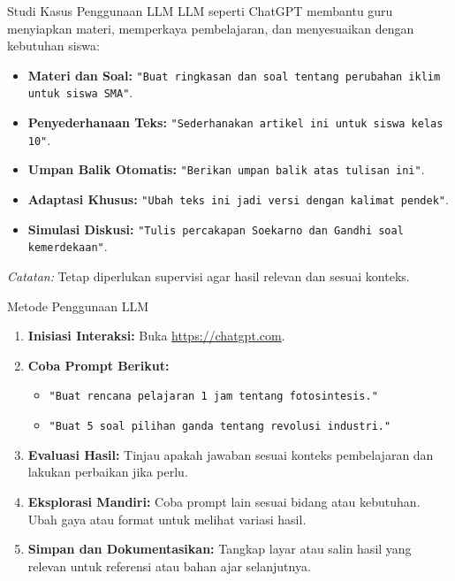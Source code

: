 \documentclass[aspectratio=169, table]{beamer}
\begin{document}
\begin{frame}[fragile]{Studi Kasus Penggunaan LLM}
\vspace{20pt}
	LLM seperti ChatGPT membantu guru menyiapkan materi, memperkaya pembelajaran, dan menyesuaikan dengan kebutuhan siswa:
	
	\begin{itemize}
		\item \textbf{Materi dan Soal:}  
		\texttt{"Buat ringkasan dan soal tentang perubahan iklim untuk siswa SMA"}.
		
		\item \textbf{Penyederhanaan Teks:}  
		\texttt{"Sederhanakan artikel ini untuk siswa kelas 10"}.
		
		\item \textbf{Umpan Balik Otomatis:}  
		\texttt{"Berikan umpan balik atas tulisan ini"}.
		
		\item \textbf{Adaptasi Khusus:}  
		\texttt{"Ubah teks ini jadi versi dengan kalimat pendek"}.
		
		\item \textbf{Simulasi Diskusi:}  
		\texttt{"Tulis percakapan Soekarno dan Gandhi soal kemerdekaan"}.
	\end{itemize}
	
	\textit{Catatan:} Tetap diperlukan supervisi agar hasil relevan dan sesuai konteks.
\end{frame}


\begin{frame}[fragile]{Metode Penggunaan LLM}
	\vspace{20pt}
	\begin{enumerate}
		\item \textbf{Inisiasi Interaksi:}  
		Buka \url{https://chatgpt.com}.
		
		\item \textbf{Coba Prompt Berikut:}
		\begin{itemize}
			\item \texttt{"Buat rencana pelajaran 1 jam tentang fotosintesis."}
			\item \texttt{"Buat 5 soal pilihan ganda tentang revolusi industri."}
		\end{itemize}
		
		\item \textbf{Evaluasi Hasil:}  
		Tinjau apakah jawaban sesuai konteks pembelajaran dan lakukan perbaikan jika perlu.
		
		\item \textbf{Eksplorasi Mandiri:}  
		Coba prompt lain sesuai bidang atau kebutuhan. Ubah gaya atau format untuk melihat variasi hasil.
		
		\item \textbf{Simpan dan Dokumentasikan:}  
		Tangkap layar atau salin hasil yang relevan untuk referensi atau bahan ajar selanjutnya.
	\end{enumerate}
\end{frame}
\end{document}
